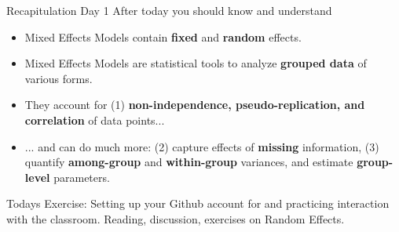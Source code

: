 \documentclass{beamer}
\begin{document}
\begin{frame}{Recapitulation Day 1}
After today you should know and understand
  \begin{itemize}
    \item Mixed Effects Models contain \textbf{fixed} and \textbf{random} effects.
    \item Mixed Effects Models are statistical tools to analyze \textbf{grouped data} of various forms.
    \item They account for (1) \textbf{non-independence, pseudo-replication, and correlation} of data points...
    \item ... and can do much more: (2) capture effects of \textbf{missing} information, (3) quantify \textbf{among-group} and \textbf{within-group} variances, and estimate \textbf{group-level} parameters.
  \end{itemize}
  Todays Exercise: Setting up your Github account for and practicing interaction with the classroom. Reading, discussion, exercises on Random Effects.
  
\end{frame}
\end{document}
